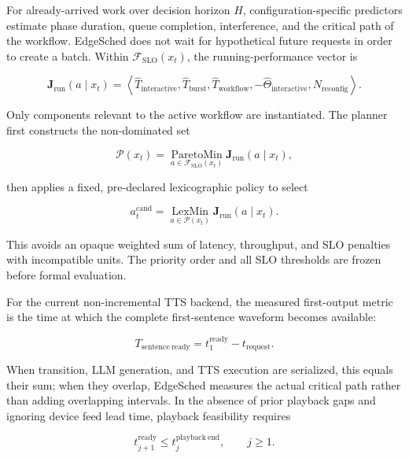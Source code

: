 \documentclass[10pt]{article}
\begin{document}
For already-arrived work over decision horizon $H$, configuration-specific
predictors estimate phase duration, queue completion, interference, and the
critical path of the workflow.  EdgeSched does not wait for hypothetical future
requests in order to create a batch.  Within $\mathcal F_{\mathrm{SLO}}(x_t)$,
the running-performance vector is

\begin{equation}
\mathbf J_{\mathrm{run}}(a\mid x_t)=\left\langle
\widehat T_{\mathrm{interactive}},
\widehat T_{\mathrm{burst}},
\widehat T_{\mathrm{workflow}},
-\widehat\Theta_{\mathrm{interactive}},
N_{\mathrm{reconfig}}
\right\rangle .
\end{equation}

Only components relevant to the active workflow are instantiated.  The planner
first constructs the non-dominated set

\begin{equation}
\mathcal P(x_t)=
\operatorname*{ParetoMin}_{a\in\mathcal F_{\mathrm{SLO}}(x_t)}
\mathbf J_{\mathrm{run}}(a\mid x_t),
\end{equation}

then applies a fixed, pre-declared lexicographic policy to select

\begin{equation}
a_t^{\mathrm{cand}}=
\operatorname*{LexMin}_{a\in\mathcal P(x_t)}
\mathbf J_{\mathrm{run}}(a\mid x_t).
\end{equation}

This avoids an opaque weighted sum of latency, throughput, and SLO penalties
with incompatible units.  The priority order and all SLO thresholds are frozen
before formal evaluation.

For the current non-incremental TTS backend, the measured first-output metric is
the time at which the complete first-sentence waveform becomes available:

\begin{equation}
T_{\mathrm{sentence\ ready}}=t_1^{\mathrm{ready}}-t_{\mathrm{request}}.
\end{equation}

When transition, LLM generation, and TTS execution are serialized, this equals
their sum; when they overlap, EdgeSched measures the actual critical path rather
than adding overlapping intervals.  In the absence of prior playback gaps and
ignoring device feed lead time, playback feasibility requires

\begin{equation}
t_{j+1}^{\mathrm{ready}}\le t_j^{\mathrm{playback\ end}},
\qquad j\ge 1.
\end{equation}
\end{document}
